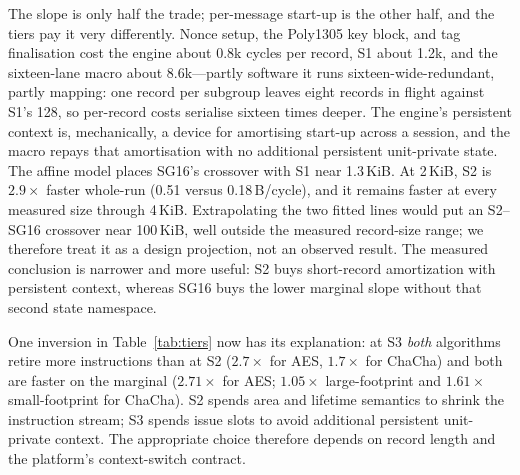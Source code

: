 \documentclass[conference]{IEEEtran}
\begin{document}
The slope is only half the trade; per-message start-up is the other half,
and the tiers pay it very differently. Nonce setup, the Poly1305 key
block, and tag finalisation cost the engine about 0.8k cycles per record,
S1 about 1.2k, and the sixteen-lane macro about 8.6k---partly software it
runs sixteen-wide-redundant, partly mapping: one record per subgroup
leaves eight records in flight against S1's 128, so per-record costs
serialise sixteen times deeper. The engine's persistent context is,
mechanically, a device for amortising start-up across a session, and the
macro repays that amortisation with no additional persistent unit-private
state. The affine model places SG16's crossover with S1 near 1.3\,KiB. At
2\,KiB, S2 is $2.9\times$ faster whole-run (0.51 versus 0.18\,B/cycle), and
it remains faster at every measured size through 4\,KiB. Extrapolating the
two fitted lines would put an S2--SG16 crossover near 100\,KiB, well outside
the measured record-size range; we therefore treat it as a design projection,
not an observed result. The measured conclusion is narrower and more useful:
S2 buys short-record amortization with persistent context, whereas SG16 buys
the lower marginal slope without that second state namespace.

One inversion in Table~\ref{tab:tiers} now has its explanation: at S3
\emph{both} algorithms retire more instructions than at S2
($2.7\times$ for AES, $1.7\times$ for ChaCha) and both are faster on the
marginal ($2.71\times$ for AES; $1.05\times$ large-footprint and
$1.61\times$ small-footprint for ChaCha). S2 spends area and lifetime
semantics to shrink the instruction stream; S3 spends issue slots to avoid
additional persistent unit-private context. The appropriate choice therefore
depends on record length and the platform's context-switch contract.
\end{document}
